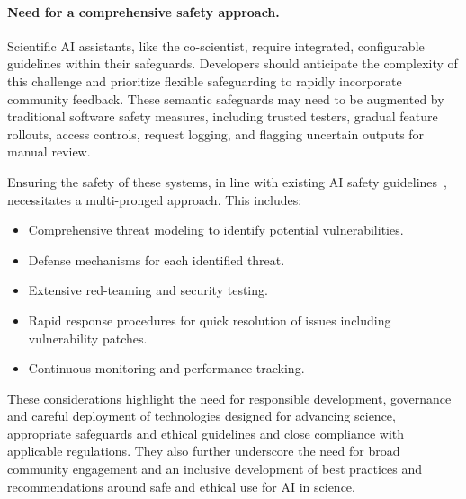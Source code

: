 \paragraph{Need for a comprehensive safety approach.}
Scientific AI assistants, like the co-scientist, require integrated, configurable guidelines within their safeguards. Developers should anticipate the complexity of this challenge and prioritize flexible safeguarding to rapidly incorporate community feedback. These semantic safeguards may need to be augmented by traditional software safety measures, including trusted testers, gradual feature rollouts, access controls, request logging, and flagging uncertain outputs for manual review.

Ensuring the safety of these systems, in line with existing AI safety guidelines~\citep{shneiderman2020bridging, anthropicscalingpolicy}, necessitates a multi-pronged approach. This includes:
\begin{itemize}
    \item Comprehensive threat modeling to identify potential vulnerabilities.
    \item Defense mechanisms for each identified threat.
    \item Extensive red-teaming and security testing.
    \item Rapid response procedures for quick resolution of issues including vulnerability patches.
    \item Continuous monitoring and performance tracking.
\end{itemize}

These considerations highlight the need for responsible development, governance and careful deployment of technologies designed for advancing science, appropriate safeguards and ethical guidelines and close compliance with applicable regulations. They also further underscore the need for broad community engagement and an inclusive development of best practices and recommendations around safe and ethical use for AI in science.

